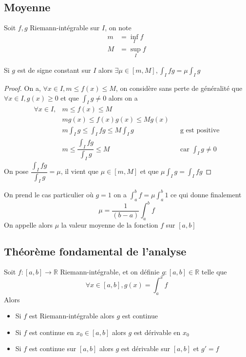 \documentclass[11pt,colorlinks]{book}
\theoremstyle{mytheoremstyle}
\theoremstyle{mytheoremstyle}
\theoremstyle{mytheoremstyle}
\theoremstyle{mytheoremstyle}
\theoremstyle{mytheoremstyle}
\theoremstyle{mytheoremstyle}
\theoremstyle{mytheoremstyle}
\theoremstyle{mytheoremstyle}
\theoremstyle{myproblemstyle}
\def\mbb#1{\mathbb{#1}}
\def\bR{\mbb{R}}
\begin{document}
  \subsection{Moyenne}
  Soit $f,g$ Riemann-intégrable sur $I$, on note 
  \begin{align*}
    m &= \inf_I f \\
    M &= \sup_I f
  \end{align*}
  \begin{prop}
    Si $g$ est de signe constant sur $I$ alors $\exists \mu \in [m,M], \int_I fg = \mu \int_I g$
    \begin{proof}
      On a, $\forall x \in I, m \leq f(x) \leq M$, on considère sans perte de généralité que $\forall x \in I, g(x) \geq 0$ et 
      que $\int_I g \not= 0$ 
      alors on a 
      \begin{align*}
        \forall x \in I,& m \leq f(x) \leq M \\ 
        &m g(x) \leq f(x)g(x) \leq Mg(x) \\ 
        &m\int_I g \leq \int_I fg \leq M \int_I g && \text{g est positive} \\ 
        &m \leq \dfrac{\int_I fg}{\int_I g} \leq M && \text{car }\int_I g \not= 0
      \end{align*}
      On pose $\dfrac{\int_I fg}{\int_I g} = \mu$, il vient que $\mu \in [m,M]$ et que $\mu \int_I g = \int_I fg$
    \end{proof}
  \end{prop}
  \begin{rmq}
    On prend le cas particulier où $g=1$ on a $\int_a^b f = \mu \int_a^b 1$ ce qui donne finalement
    \begin{equation*}
      \mu = \dfrac{1}{(b-a)} \int_a^b f
    \end{equation*}
    On appelle alors $\mu$ la valeur moyenne de la fonction $f$ sur $[a,b]$ 
  \end{rmq}
  \subsection{Théorème fondamental de l'analyse}
  
  \begin{prop}
    Soit $f : [a,b] \to \bR$ Riemann-intégrable, et on définie $g : [a,b] \in \bR$ telle que 
    \begin{equation*}
    \forall x \in [a,b], g(x) = \int_a^x f
    \end{equation*}
    Alors
    \begin{itemize}
      \item Si $f$ est Riemann-intégrable alors $g$ est continue
      \item Si $f$ est continue en $x_0 \in [a,b]$ alors $g$ est dérivable en $x_0$
      \item Si $f$ est continue sur $[a,b]$ alors $g$ est dérivable sur $[a,b]$ et $g' = f$
    \end{itemize}
  \end{prop}
\end{document}
